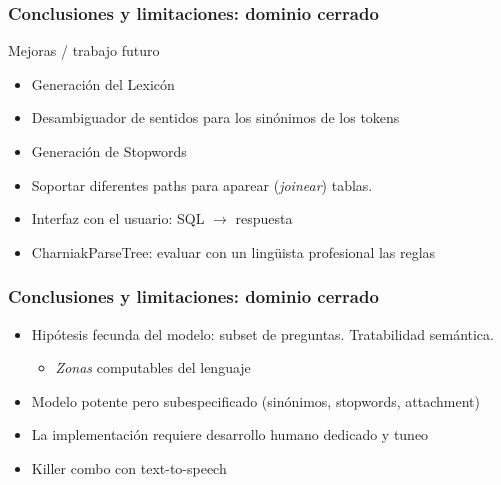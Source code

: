 \begin{frame}
\frametitle{Conclusiones y limitaciones: dominio cerrado}
Mejoras / trabajo futuro
\begin{itemize}
\item Generación del Lexicón
\item Desambiguador de sentidos para los sinónimos de los tokens
\item Generación de Stopwords
\item Soportar diferentes paths para aparear (\textit{joinear}) tablas.
\item Interfaz con el usuario: SQL $\rightarrow$ respuesta
\item CharniakParseTree: evaluar con un lingüista profesional las reglas

\end{itemize}
\end{frame}


\begin{frame}
\frametitle{Conclusiones y limitaciones: dominio cerrado}

\begin{itemize}
  \item Hipótesis fecunda del modelo: subset de preguntas. Tratabilidad semántica.
  \begin{itemize}
    \item \textit{Zonas} computables del lenguaje
  \end{itemize}
  \item Modelo potente pero subespecificado (sinónimos, stopwords, attachment)
  \item La implementación requiere desarrollo humano dedicado y tuneo
  \item Killer combo con text-to-speech
  \end{itemize}

\end{frame}




